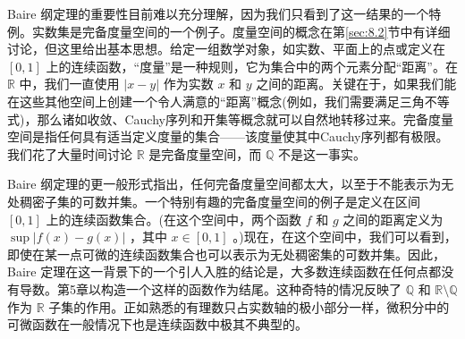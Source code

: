 Baire 纲定理的重要性目前难以充分理解，因为我们只看到了这一结果的一个特例。实数集是完备度量空间的一个例子。度量空间的概念在第\ref{sec:8.2}节中有详细讨论，但这里给出基本思想。给定一组数学对象，如实数、平面上的点或定义在 \(\left\lbrack  {0,1}\right\rbrack\) 上的连续函数，“度量”是一种规则，它为集合中的两个元素分配“距离”。在 \(\mathbb{R}\) 中，我们一直使用 \(\left| {x - y}\right|\) 作为实数 \(x\) 和 \(y\) 之间的距离。关键在于，如果我们能在这些其他空间上创建一个令人满意的“距离”概念(例如，我们需要满足三角不等式)，那么诸如收敛、Cauchy序列和开集等概念就可以自然地转移过来。完备度量空间是指任何具有适当定义度量的集合——该度量使其中Cauchy序列都有极限。我们花了大量时间讨论 \(\mathbb{R}\) 是完备度量空间，而 \(\mathbb{Q}\) 不是这一事实。

Baire 纲定理的更一般形式指出，任何完备度量空间都太大，以至于不能表示为无处稠密子集的可数并集。一个特别有趣的完备度量空间的例子是定义在区间 \(\left\lbrack  {0,1}\right\rbrack\) 上的连续函数集合。(在这个空间中，两个函数 \(f\) 和 \(g\) 之间的距离定义为 \(\sup \left| {f\left( x\right)  - g\left( x\right) }\right|\) ，其中 \(x \in  \left\lbrack  {0,1}\right\rbrack\) 。)现在，在这个空间中，我们可以看到，即使在某一点可微的连续函数集合也可以表示为无处稠密集的可数并集。因此，Baire 定理在这一背景下的一个引人入胜的结论是，大多数连续函数在任何点都没有导数。第5章以构造一个这样的函数作为结尾。这种奇特的情况反映了 \(\mathbb{Q}\) 和 \(\mathbb{R}\setminus\mathbb{Q}\) 作为 \(\mathbb{R}\) 子集的作用。正如熟悉的有理数只占实数轴的极小部分一样，微积分中的可微函数在一般情况下也是连续函数中极其不典型的。

